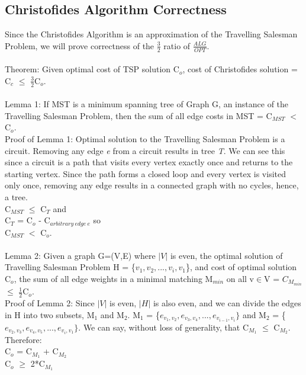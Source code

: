 \documentclass[12pt, oneside]{article}   	%
\newcommand\tab[1][1cm]{\hspace*{#1}}
\begin{document}
\subsection{Christofides Algorithm Correctness}
\indent\indent Since the Christofides Algorithm is an approximation of the Travelling Salesman Problem, we will prove correctness of the  $\frac{3}{2}$ ratio of $\frac{ALG}{OPT}$.\\\\
\indent\indent Theorem: Given optimal cost of TSP solution C$_o$, cost of Christofides solution = C$_c$ $\leq$ $\frac{3}{2}$C$_o$.\\\\
\indent\indent Lemma 1: If MST is a minimum spanning tree of Graph G, an instance of the Travelling Salesman Problem, then the sum of all edge costs in MST = C$_{MST}$ $<$  C$_o$.\\
\indent\indent Proof of Lemma 1: Optimal solution to the Travelling Salesman Problem is a circuit. Removing any edge \textit{e} from a circuit results in tree \textit{T}.  We can see this since a circuit is a path that visits every vertex exactly once and returns to the starting vertex.  Since the path forms a closed loop and every vertex is visited only once, removing any edge results in a connected graph with no cycles, hence, a tree.\\
\indent\indent\indent C$_{MST}$ $\leq$ C$_T$ \tab \tab \tab \tab and\\
\indent\indent\indent C$_T$  = C$_{o}$ - C$_{arbitrary\ edge\ e}$ \tab \tab so\\
\indent\indent\indent C$_{MST}$ $<$ C$_{o}$.\\\\
\indent\indent Lemma 2: Given a graph G=(V,E) where $|V|$ is even, the optimal solution of Travelling Salesman Problem H = \{$v_1,v_2,...,v_i,v_1$\}, and cost of optimal solution C$_o$, the sum of all edge weights in a minimal matching M$_{min}$ on all v$\in$V = $C_{M_{min}}$ $\leq$ $\frac{1}{2}$C$_o$.\\
\indent\indent Proof of Lemma 2: Since $|V|$ is even, $|H|$ is also even, and we can divide the edges in H into two subsets, M$_1$ and M$_2$.  M$_1$ = \{$e_{v_1,v_2},e_{v_3,v_4},...,e_{v_{i-1},v_i}\}$ and M$_2$ = \{$e_{v_2,v_3},e_{v_4,v_5},...,e_{v_i,v_1}\}$.  We can say, without loss of generality, that C$_{M_1}$ $\leq$ C$_{M_2}$.  Therefore:\\
\indent\indent\indent C$_o$ = C$_{M_1}$ + C$_{M_2}$\\
\indent\indent\indent C$_o$ $\geq$ 2*C$_{M_1}$\\
\end{document}
